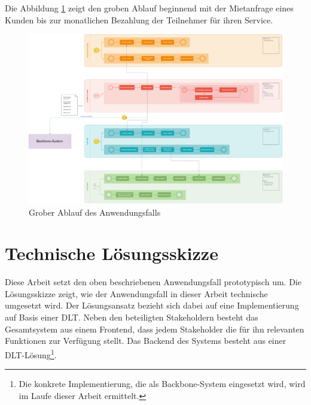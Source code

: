 Die Abbildung \ref{fig:chapter04:usecase_workflow} zeigt den groben Ablauf beginnend mit der Mietanfrage eines Kunden bis zur monatlichen Bezahlung der Teilnehmer für ihren Service.

\begin{figure}[htbp]
 \centering
 \includegraphics[width=1.0\textwidth]{gfx/IOT-Anwendungsfall_Ablauf.png}
 \caption{Grober Ablauf des Anwendungsfalls}
 \label{fig:chapter04:usecase_workflow}
\end{figure}

%
%
\section{Technische Lösungsskizze}
\label{sec:iot_usecase:solution}
Diese Arbeit setzt den oben beschriebenen Anwendungsfall prototypisch um. Die Lösungsskizze zeigt, wie der Anwendungsfall in dieser Arbeit technische umgesetzt wird. Der Lösungsansatz bezieht sich dabei auf eine Implementierung auf Basis einer \ac{DLT}. Neben den beteiligten Stakeholdern besteht das Gesamtsystem aus einem Frontend, dass jedem Stakeholder die für ihn relevanten Funktionen zur Verfügung stellt. Das Backend des Systems besteht aus einer \ac{DLT}-Lösung\footnote{Die konkrete Implementierung, die als Backbone-System eingesetzt wird, wird im Laufe dieser Arbeit ermittelt.}.


